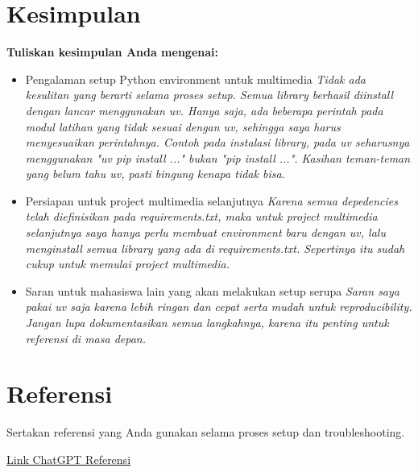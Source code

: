\documentclass[11pt,a4paper]{article}
\begin{document}
\section{Kesimpulan}
\textbf{Tuliskan kesimpulan Anda mengenai:}
\begin{itemize}
    \item Pengalaman setup Python environment untuk multimedia
    \newline
    \textit{Tidak ada kesulitan yang berarti selama proses setup. Semua library berhasil diinstall dengan lancar menggunakan uv. Hanya saja, ada beberapa perintah pada modul latihan yang tidak sesuai dengan uv, sehingga saya harus menyesuaikan perintahnya. Contoh pada instalasi library, pada uv seharusnya menggunakan "uv pip install ..." bukan "pip install ...". Kasihan teman-teman yang belum tahu uv, pasti bingung kenapa tidak bisa.}
    \item Persiapan untuk project multimedia selanjutnya
    \newline
    \textit{Karena semua depedencies telah diefinisikan pada requirements.txt, maka untuk project multimedia selanjutnya saya hanya perlu membuat environment baru dengan uv, lalu menginstall semua library yang ada di requirements.txt. Sepertinya itu sudah cukup untuk memulai project multimedia.}
    \item Saran untuk mahasiswa lain yang akan melakukan setup serupa
    \newline
    \textit{Saran saya pakai uv saja karena lebih ringan dan cepat serta mudah untuk reproducibility. Jangan lupa dokumentasikan semua langkahnya, karena itu penting untuk referensi di masa depan.}
\end{itemize}

\section{Referensi}
Sertakan referensi yang Anda gunakan selama proses setup dan troubleshooting.

\newpage


\href{https://chatgpt.com/share/68b1371d-844c-8008-a1ef-9929fc0ed9b0}{Link ChatGPT Referensi}
\end{document}

